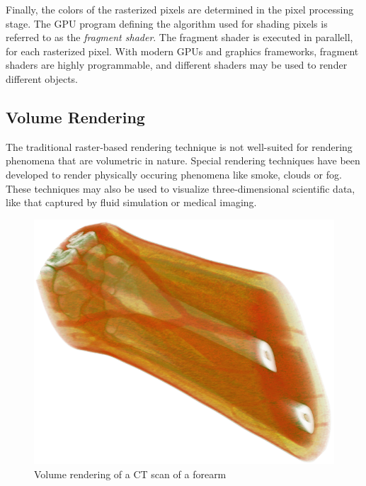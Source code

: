 \documentclass{article}
\begin{document}
Finally, the colors of the rasterized pixels are determined in the pixel processing stage.
The GPU program defining the algorithm used for shading pixels is referred to as the \textit{fragment shader}.
The fragment shader is executed in parallell, for each rasterized pixel. With modern GPUs and graphics frameworks, fragment shaders are highly programmable, and different shaders may be used to render different objects.

\subsection{Volume Rendering}
The traditional raster-based rendering technique is not well-suited for rendering phenomena that are volumetric in nature.
Special rendering techniques have been developed to render physically occuring phenomena like smoke, clouds or fog. These techniques
may also be used to visualize three-dimensional scientific data, like that captured by fluid simulation or medical imaging.

\begin{figure}[tbh]
    \centering
    \includegraphics[width=1.0\textwidth]{images/VolumeRendering.png}
    \caption{Volume rendering of a CT scan of a forearm}
    \label{fig:graphicsTransformations}
\end{figure}




\end{document}

